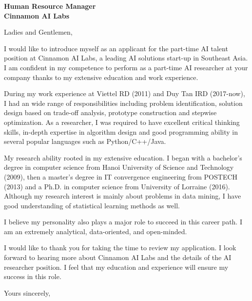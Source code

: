 \documentclass[10pt,a4paper]{letter}
\begin{document}
\begin{letter}
{\large{\textbf{Human Resource Manager\\
Cinnamon AI Labs}}
}

\opening{Ladies and Gentlemen,}

I would like to introduce myself as an applicant for the part-time AI talent position at Cinnamon AI Labs, a leading AI solutions start-up in Southeast Asia. I am confident in my competence to perform as a part-time AI researcher at your company thanks to my extensive education and work experience.

During my work experience at Viettel RD (2011) and Duy Tan IRD (2017-now), I had an wide range of responsibilities including problem identification, solution design based on trade-off analysis, prototype construction and stepwise optimization. As a researcher, I was required to have excellent critical thinking skills, in-depth expertise in algorithm design and good programming ability in several popular languages such as Python/C++/Java.

My research ability rooted in my extensive education. I began with a bachelor's degree in computer science from Hanoi University of Science and Technology (2009), then a master's degree in IT convergence engineering from POSTECH (2013) and a Ph.D. in computer science from University of Lorraine (2016). Although my research interest is mainly about problems in data mining, I have good understanding of statistical learning methods as well. 

I believe my personality also plays a major role to succeed in this career path. I am an extremely analytical, data-oriented, and open-minded. 

I would like to thank you for taking the time to review my application. 
I look forward to hearing more about Cinnamon AI Labs and the details of the AI researcher position. 
I feel that my education and experience will ensure my success in this role.

\closing{Yours sincerely,}

\end{letter}
\end{document}
